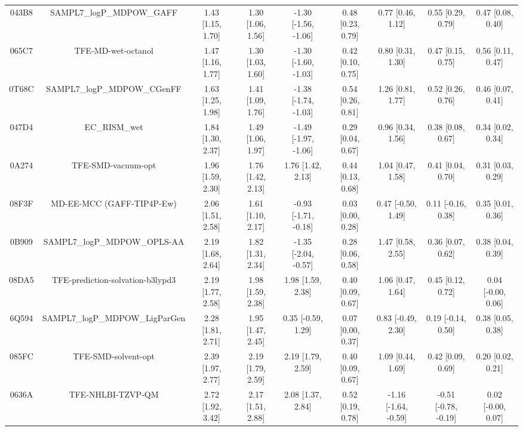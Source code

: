 \documentclass{article}
\begin{document}
\begin{center}
\begin{longtable}{|ccccccccc|}
 043B8 &               SAMPL7\_logP\_MDPOW\_GAFF &  1.43 [1.15, 1.70] &  1.30 [1.06, 1.56] &  -1.30 [-1.56, -1.06] &  0.48 [0.23, 0.79] &     0.77 [0.46, 1.12] &     0.55 [0.29, 0.79] &     0.47 [0.08, 0.40] \\
 065C7 &                      TFE-MD-wet-octanol &  1.47 [1.16, 1.77] &  1.30 [1.03, 1.60] &  -1.30 [-1.60, -1.03] &  0.42 [0.10, 0.75] &     0.80 [0.31, 1.30] &     0.47 [0.15, 0.75] &     0.56 [0.11, 0.47] \\
 0T68C &             SAMPL7\_logP\_MDPOW\_CGenFF &  1.63 [1.25, 1.98] &  1.41 [1.09, 1.76] &  -1.38 [-1.74, -1.03] &  0.54 [0.26, 0.81] &     1.26 [0.81, 1.77] &     0.52 [0.26, 0.76] &     0.46 [0.07, 0.41] \\
 047D4 &                           EC\_RISM\_wet &  1.84 [1.30, 2.37] &  1.49 [1.06, 1.97] &  -1.49 [-1.97, -1.06] &  0.29 [0.04, 0.67] &     0.96 [0.34, 1.56] &     0.38 [0.08, 0.67] &     0.34 [0.02, 0.34] \\
 0A274 &                      TFE-SMD-vacuum-opt &  1.96 [1.59, 2.30] &  1.76 [1.42, 2.13] &     1.76 [1.42, 2.13] &  0.44 [0.13, 0.68] &     1.04 [0.47, 1.58] &     0.41 [0.04, 0.70] &     0.31 [0.03, 0.29] \\
 08F3F &               MD-EE-MCC (GAFF-TIP4P-Ew) &  2.06 [1.51, 2.58] &  1.61 [1.10, 2.17] &  -0.93 [-1.71, -0.18] &  0.03 [0.00, 0.28] &    0.47 [-0.50, 1.49] &    0.11 [-0.16, 0.38] &     0.35 [0.01, 0.36] \\
 0B909 &            SAMPL7\_logP\_MDPOW\_OPLS-AA &  2.19 [1.68, 2.64] &  1.82 [1.31, 2.34] &  -1.35 [-2.04, -0.57] &  0.28 [0.06, 0.58] &     1.47 [0.58, 2.55] &     0.36 [0.07, 0.62] &     0.38 [0.04, 0.39] \\
 08DA5 &        TFE-prediction-solvation-b3lypd3 &  2.19 [1.77, 2.58] &  1.98 [1.59, 2.38] &     1.98 [1.59, 2.38] &  0.40 [0.09, 0.67] &     1.06 [0.47, 1.64] &     0.45 [0.12, 0.72] &    0.04 [-0.00, 0.06] \\
 6Q594 &          SAMPL7\_logP\_MDPOW\_LigParGen &  2.28 [1.81, 2.71] &  1.95 [1.47, 2.45] &    0.35 [-0.59, 1.29] &  0.07 [0.00, 0.37] &    0.83 [-0.49, 2.30] &    0.19 [-0.14, 0.50] &     0.38 [0.05, 0.38] \\
 085FC &                     TFE-SMD-solvent-opt &  2.39 [1.97, 2.77] &  2.19 [1.79, 2.59] &     2.19 [1.79, 2.59] &  0.40 [0.09, 0.67] &     1.09 [0.44, 1.69] &     0.42 [0.09, 0.69] &     0.20 [0.02, 0.21] \\
 0636A &                       TFE-NHLBI-TZVP-QM &  2.72 [1.92, 3.42] &  2.17 [1.51, 2.88] &     2.08 [1.37, 2.84] &  0.52 [0.19, 0.78] &  -1.16 [-1.64, -0.59] &  -0.51 [-0.78, -0.19] &    0.02 [-0.00, 0.07] \\

\end{longtable}
\end{center}
\end{document}
